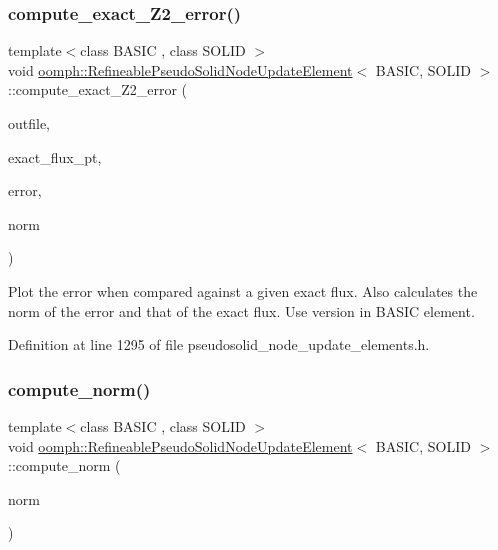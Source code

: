 \subsubsection{\texorpdfstring{compute\+\_\+exact\+\_\+\+Z2\+\_\+error()}{compute\_exact\_Z2\_error()}}
{\footnotesize\ttfamily template$<$class B\+A\+S\+IC , class S\+O\+L\+ID $>$ \\
void \hyperlink{classoomph_1_1RefineablePseudoSolidNodeUpdateElement}{oomph\+::\+Refineable\+Pseudo\+Solid\+Node\+Update\+Element}$<$ B\+A\+S\+IC, S\+O\+L\+ID $>$\+::compute\+\_\+exact\+\_\+\+Z2\+\_\+error (\begin{DoxyParamCaption}\item[{std\+::ostream \&}]{outfile,  }\item[{\hyperlink{classoomph_1_1FiniteElement_a690fd33af26cc3e84f39bba6d5a85202}{Finite\+Element\+::\+Steady\+Exact\+Solution\+Fct\+Pt}}]{exact\+\_\+flux\+\_\+pt,  }\item[{double \&}]{error,  }\item[{double \&}]{norm }\end{DoxyParamCaption})\hspace{0.3cm}{\ttfamily [inline]}}



Plot the error when compared against a given exact flux. Also calculates the norm of the error and that of the exact flux. Use version in B\+A\+S\+IC element. 



Definition at line 1295 of file pseudosolid\+\_\+node\+\_\+update\+\_\+elements.\+h.

\mbox{\label{classoomph_1_1RefineablePseudoSolidNodeUpdateElement_a2a7fb32ce6b9b442f7b328d382ff017a}} 
\subsubsection{\texorpdfstring{compute\+\_\+norm()}{compute\_norm()}}
{\footnotesize\ttfamily template$<$class B\+A\+S\+IC , class S\+O\+L\+ID $>$ \\
void \hyperlink{classoomph_1_1RefineablePseudoSolidNodeUpdateElement}{oomph\+::\+Refineable\+Pseudo\+Solid\+Node\+Update\+Element}$<$ B\+A\+S\+IC, S\+O\+L\+ID $>$\+::compute\+\_\+norm (\begin{DoxyParamCaption}\item[{double \&}]{norm }\end{DoxyParamCaption})\hspace{0.3cm}{\ttfamily [inline]}}



